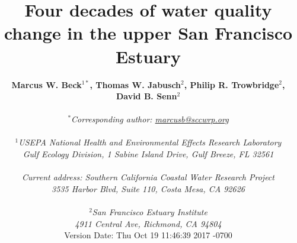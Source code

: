 \documentclass[letterpaper,12pt,oneside]{article}\usepackage[]{graphicx}\usepackage[]{color}
\begin{document}
\raggedbottom
\linenumbers
\raggedright
{}
\setlength{\parindent}{0.5in}
\renewcommand\refname{References \vspace{12pt}}

\begin{singlespace}
\title{{\bf {\Large Four decades of water quality change in the upper San Francisco Estuary}}}
\author{
  {\bf {\normalsize Marcus W. Beck$^{1*}$, Thomas W. Jabusch$^2$, Philip R. Trowbridge$^2$, David B. Senn$^2$}}
  \\\\{\textit {\normalsize $^*$Corresponding author: \href{mailto:marcusb@sccwrp.org}{marcusb@sccwrp.org}}}
  \\\\{\textit {\normalsize $^1$USEPA National Health and Environmental Effects Research Laboratory}}
  \\{\textit {\normalsize Gulf Ecology Division, 1 Sabine Island Drive, Gulf Breeze, FL 32561}}
  \\\\{\textit {\normalsize Current address: Southern California Coastal Water Research Project}}
  \\{\textit {\normalsize 3535 Harbor Blvd, Suite 110, Costa Mesa, CA 92626}}
  \\\\{\textit {\normalsize $^2$San Francisco Estuary Institute}}
	\\{\textit {\normalsize 4911 Central Ave, Richmond, CA 94804}}
  \vspace{1in}
  \\ Version Date:   Thu Oct 19 11:46:39 2017 -0700
	}
\date{}
\maketitle
\end{singlespace}
\clearpage
\end{document}

